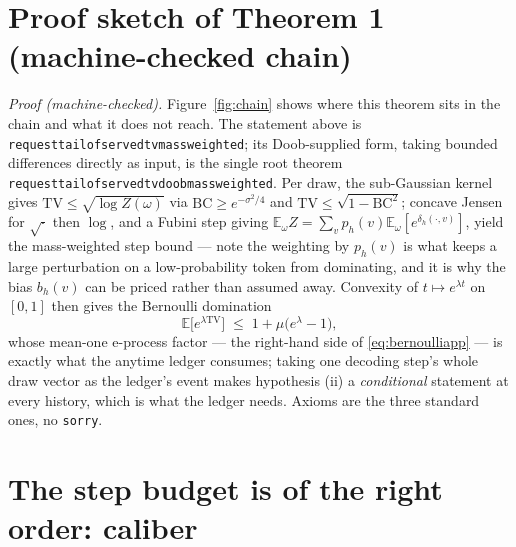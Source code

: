 \documentclass[11pt]{article}
\renewcommand{\_}{\WCorigunderscore\allowbreak}
\begin{document}
\section{Proof sketch of Theorem 1 (machine-checked chain)}
\label{app:proof}

\noindent\emph{Proof (machine-checked). } Figure~\ref{fig:chain} shows
where this theorem sits in the chain and what it does not reach. The
statement above is
\texttt{request\_tail\_of\_served\_tv\_massweighted}; its Doob-supplied
form, taking bounded differences directly as input, is the single root
theorem \texttt{request\_tail\_of\_served\_tv\_doob\_massweighted}. Per draw, the
sub-Gaussian kernel gives $\mathrm{TV}\le\sqrt{\log Z(\omega)}$ via
$\mathrm{BC}\ge e^{-\sigma^2/4}$ and $\mathrm{TV}\le\sqrt{1-\mathrm{BC}^2}$;
concave Jensen for $\sqrt{\cdot}$ then $\log$, and a Fubini step giving
$\mathbb{E}_\omega Z=\sum_v p_h(v)\mathbb{E}_\omega[e^{\delta_h(\cdot,v)}]$,
yield the mass-weighted step bound --- note the weighting by $p_h(v)$ is
what keeps a large perturbation on a low-probability token from
dominating, and it is why the bias $b_h(v)$ can be priced rather than
assumed away. Convexity of $t\mapsto e^{\lambda t}$ on $[0,1]$ then gives the
Bernoulli domination
\begin{equation}\label{eq:bernoulliapp}
  \mathbb{E}\big[e^{\lambda\mathrm{TV}}\big]\;\le\;1+\mu\big(e^\lambda-1\big),
\end{equation}
whose mean-one e-process factor --- the right-hand side of
\eqref{eq:bernoulliapp} --- is exactly what the anytime ledger consumes; taking one decoding step's
whole draw vector as the ledger's event makes hypothesis (ii) a
\emph{conditional} statement at every history, which is what the ledger
needs. Axioms are the three standard ones, no \texttt{sorry}.


\section{The step budget is of the right order: caliber}
\label{app:rightorder}
\end{document}
